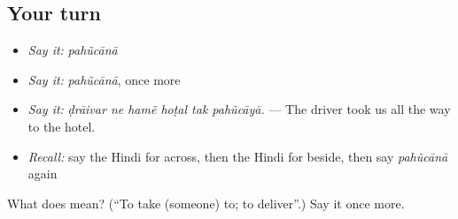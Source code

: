 \subsection*{Your turn}
\begin{itemize}
\raggedright
  \item \emph{Say it:} \emph{pahũcānā}
  \item \emph{Say it:} \emph{pahũcānā}, once more
  \item \emph{Say it:} \emph{ḍrāivar ne hamẽ hoṭal tak pahũcāyā.} — The driver took us all the way to the hotel.
  \item \emph{Recall:} say the Hindi for across, then the Hindi for beside, then say \emph{pahũcānā} again
\end{itemize}

\begin{tcolorbox}[breakable,colback=teal!4,colframe=teal!35!black,title={Before you move on}]
What does  mean? (\textquotedblleft{}To take (someone) to; to deliver\textquotedblright{}.) Say it once more.
\end{tcolorbox}
